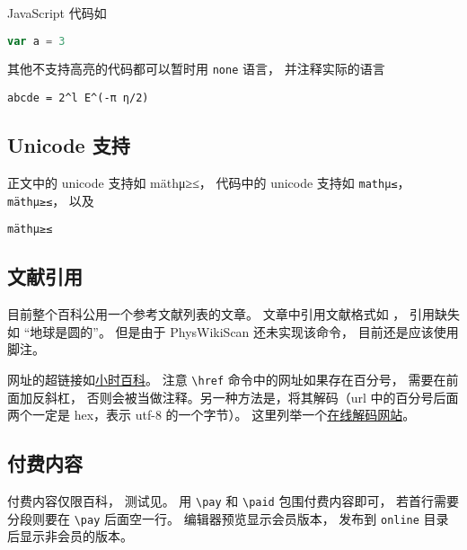 JavaScript 代码如
\begin{lstlisting}[language=js]
var a = 3
\end{lstlisting}

其他不支持高亮的代码都可以暂时用 \verb`none` 语言， 并注释实际的语言
\begin{lstlisting}[language=none]
abcde = 2^l E^(-π η/2)
\end{lstlisting}

\subsection{Unicode 支持}
正文中的 unicode 支持如 mäthμ≥≤， 代码中的 unicode 支持如 \verb`mathμ≤`， \lstinline|mäthμ≥≤|， 以及
\begin{lstlisting}[language=none]
mäthμ≥≤
\end{lstlisting}


\subsection{文献引用}
目前整个百科公用一个参考文献列表的文章。 文章中引用文献格式如 \cite{GriffE}， 引用缺失如 “地球是圆的\needCite”。 但是由于 PhysWikiScan 还未实现该命令， 目前还是应该使用脚注。

网址的超链接如\href{https://wuli.wiki}{小时百科}。 注意 \verb`\href` 命令中的网址如果存在百分号， 需要在前面加反斜杠， 否则会被当做注释。另一种方法是，将其解码（url 中的百分号后面两个一定是 hex，表示 utf-8 的一个字节）。 这里列举一个\href{https://www.webatic.com/url-convertor}{在线解码网站}。

\subsection{付费内容}
付费内容仅限百科， 测试见。 用 \verb`\pay` 和 \verb`\paid` 包围付费内容即可， 若首行需要分段则要在 \verb`\pay` 后面空一行。 编辑器预览显示会员版本， 发布到 \verb`online` 目录后显示非会员的版本。


